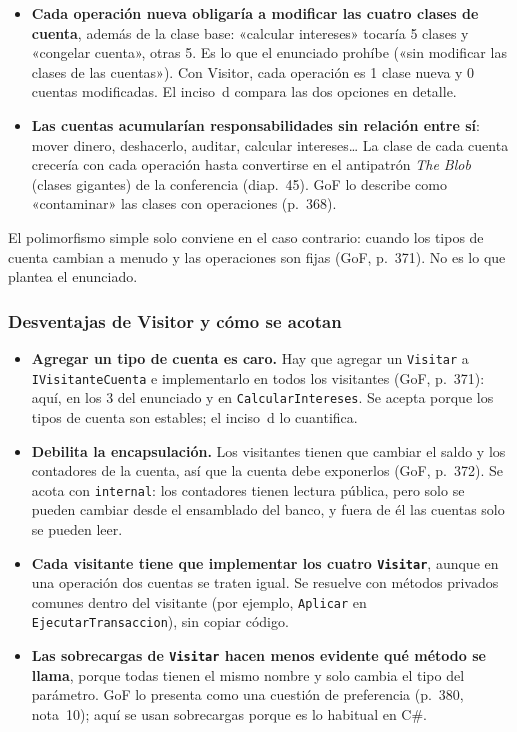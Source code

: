 \begin{itemize}
  \item \textbf{Cada operación nueva obligaría a modificar las cuatro clases de cuenta},
        además de la clase base: «calcular intereses» tocaría 5 clases y «congelar cuenta»,
        otras 5. Es lo que el enunciado prohíbe («sin modificar las clases de las cuentas»).
        Con Visitor, cada operación es 1 clase nueva y 0 cuentas modificadas. El inciso~d
        compara las dos opciones en detalle.
  \item \textbf{Las cuentas acumularían responsabilidades sin relación entre sí}: mover
        dinero, deshacerlo, auditar, calcular intereses\ldots{} La clase de cada cuenta
        crecería con cada operación hasta convertirse en el antipatrón \emph{The Blob} (clases
        gigantes) de la conferencia (diap.~45). GoF lo describe como «contaminar» las clases
        con operaciones (p.~368).
\end{itemize}

El polimorfismo simple solo conviene en el caso contrario: cuando los tipos de cuenta cambian
a menudo y las operaciones son fijas (GoF, p.~371). No es lo que plantea el enunciado.

\subsubsection{Desventajas de Visitor y cómo se acotan}

\begin{itemize}
  \item \textbf{Agregar un tipo de cuenta es caro.} Hay que agregar un \texttt{Visitar} a
        \texttt{IVisitanteCuenta} e implementarlo en todos los visitantes (GoF, p.~371): aquí,
        en los 3 del enunciado y en \texttt{CalcularIntereses}. Se acepta porque los tipos de
        cuenta son estables; el inciso~d lo cuantifica.
  \item \textbf{Debilita la encapsulación.} Los visitantes tienen que cambiar el saldo y los
        contadores de la cuenta, así que la cuenta debe exponerlos (GoF, p.~372). Se acota con
        \texttt{internal}: los contadores tienen lectura pública, pero solo se pueden cambiar
        desde el ensamblado del banco, y fuera de él las cuentas solo se pueden leer.
  \item \textbf{Cada visitante tiene que implementar los cuatro \texttt{Visitar}}, aunque en
        una operación dos cuentas se traten igual. Se resuelve con métodos privados comunes
        dentro del visitante (por ejemplo, \texttt{Aplicar} en \texttt{EjecutarTransaccion}),
        sin copiar código.
  \item \textbf{Las sobrecargas de \texttt{Visitar} hacen menos evidente qué método se
        llama}, porque todas tienen el mismo nombre y solo cambia el tipo del parámetro. GoF
        lo presenta como una cuestión de preferencia (p.~380, nota~10); aquí se usan
        sobrecargas porque es lo habitual en C\#.
\end{itemize}

